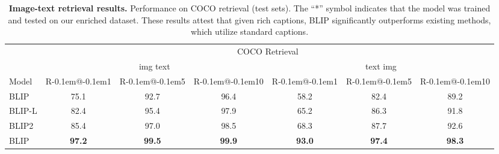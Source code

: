 \begin{table}
  \centering
\begin{tabular}{l *{3}{c@{\hspace{5pt}}} | *{3}{c@{\hspace{5pt}}}}
    \toprule
    & \multicolumn{6}{c}{COCO Retrieval} \\
    & \multicolumn{3}{c}{img  text} & \multicolumn{3}{c}{text  img} \\
    \cmidrule(lr){2-4} \cmidrule(lr){5-7}
    Model & 
    R\kern-0.1em@\kern-0.1em1 & R\kern-0.1em@\kern-0.1em5 & R\kern-0.1em@\kern-0.1em10 & R\kern-0.1em@\kern-0.1em1 & R\kern-0.1em@\kern-0.1em5 & R\kern-0.1em@\kern-0.1em10 \\
    \midrule
    BLIP & 75.1 & 92.7 & 96.4 & 58.2 & 82.4 & 89.2 \\
    BLIP-L & 82.4 & 95.4 & 97.9 & 65.2 & 86.3 & 91.8 \\
    BLIP2 & 85.4 & 97.0 & 98.5 & 68.3 & 87.7 & 92.6 \\
    \midrule
    BLIP & \textbf{97.2} & \textbf{99.5} & \textbf{99.9} & \textbf{93.0} & \textbf{97.4} & \textbf{98.3} \\
    \bottomrule
\end{tabular}
\vspace{7pt}
  \caption{\textbf{Image-text retrieval results.} Performance on COCO retrieval (test sets). The ``*'' symbol indicates that the model was trained and tested on our enriched dataset. These results attest that given rich captions, BLIP significantly outperforms existing methods, which utilize standard captions.
}
  \label{coco_retrieval}
  \vspace{-0.3cm}
\end{table}





